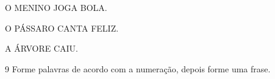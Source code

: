 \begin{myquote}
O MENINO JOGA BOLA.
\end{myquote}

\begin{mdframed}[linewidth=2pt,linecolor=salmao]
\vspace{7cm}
\end{mdframed}

\begin{myquote}
O PÁSSARO CANTA FELIZ.
\end{myquote}

\begin{mdframed}[linewidth=2pt,linecolor=salmao]
\vspace{7cm}
\end{mdframed}

\begin{myquote}
A ÁRVORE CAIU.
\end{myquote}

\begin{mdframed}[linewidth=2pt,linecolor=salmao]
\vspace{7cm}
\end{mdframed}


\num{9} Forme palavras de acordo com a numeração, depois forme uma frase.


